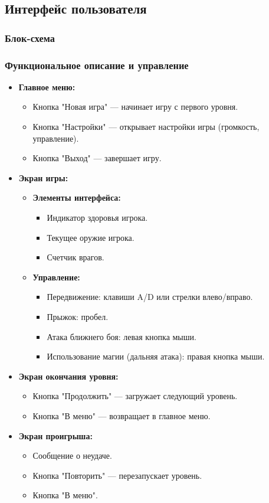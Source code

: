\documentclass{article}
\begin{document}
\subsection{Интерфейс пользователя}

\subsubsection{Блок-схема}
\subsubsection{Функциональное описание и управление}
\begin{itemize}
    \item \textbf{Главное меню:}
    \begin{itemize}
        \item Кнопка "Новая игра" — начинает игру с первого уровня.
        \item Кнопка "Настройки" — открывает настройки игры (громкость, управление).
        \item Кнопка "Выход" — завершает игру.
    \end{itemize}
    \item \textbf{Экран игры:}
    \begin{itemize}
        \item \textbf{Элементы интерфейса:}
        \begin{itemize}
            \item Индикатор здоровья игрока.
            \item Текущее оружие игрока.
            \item Счетчик врагов.
        \end{itemize}
        \item \textbf{Управление:}
        \begin{itemize}
            \item Передвижение: клавиши A/D или стрелки влево/вправо.
            \item Прыжок: пробел.
            \item Атака ближнего боя: левая кнопка мыши.
            \item Использование магии (дальняя атака): правая кнопка мыши.
        \end{itemize}
    \end{itemize}
    \item \textbf{Экран окончания уровня:}
    \begin{itemize}
        \item Кнопка "Продолжить" — загружает следующий уровень.
        \item Кнопка "В меню" — возвращает в главное меню.
    \end{itemize}
    \item \textbf{Экран проигрыша:}
    \begin{itemize}
        \item Сообщение о неудаче.
        \item Кнопка "Повторить" — перезапускает уровень.
        \item Кнопка "В меню".
    \end{itemize}
\end{itemize}
\end{document}
